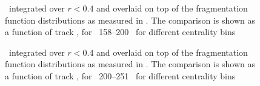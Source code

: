 \begin{figure}
\caption{\Rdptr\ integrated over $ r < 0.4$ and overlaid on top of the fragmentation function distributions as measured in \cite{ATLAS502FFConf}. The comparison is shown as a function of track \pt, for  \ptjet\ 158--200 \GeV\,  for different centrality bins }
\label{fig:FF_comparison_jet2}
\end{figure}

\begin{figure}
\caption{\Rdptr\ integrated over $ r < 0.4$ and overlaid on top of the fragmentation function distributions as measured in \cite{ATLAS502FFConf}. The comparison is shown as a function of track \pt, for \ptjet\ 200--251 \GeV\,  for different centrality bins }
\label{fig:FF_comparison_jet3}
\end{figure}

